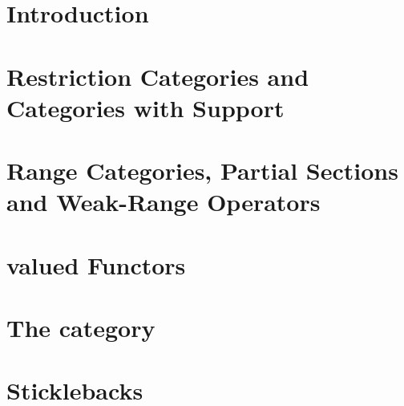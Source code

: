 \documentclass[10pt,a4paper]{article}
\theoremstyle{remark}
\begin{document}
\newcommand{\zigzagTupleEndShortened}[3]
{
\tuple{#1_1,#1'_1,...#1'_{#2-1}, #1_{#2-1} \circ s}    
}

\newcommand{\zigzagTailTuple}[3]
{
\tuple{#1_#2,#1'_#2,...#1_{#2+#3-1},#1'_{#2+#3-1},#1_{#2+#3}}    
}

\newcommand{\restrictToDSource}[2]{
\overline{D(#1_1)}\circ ... \circ \overline{D(#1_#2)}
}


\newcommand{\restrictToSource}[2]{
\overline{#1_1}\circ ... \circ \overline{#1_#2}
}

\newcommand{\conc}{::}



\tableofcontents


\section{Introduction}


\section{Restriction Categories and Categories with Support}


\section{Range Categories, Partial Sections and Weak-Range Operators}
 

\section{\Par valued Functors}



\section{The category \Rel}


\section{Sticklebacks}
%

\end{document}

